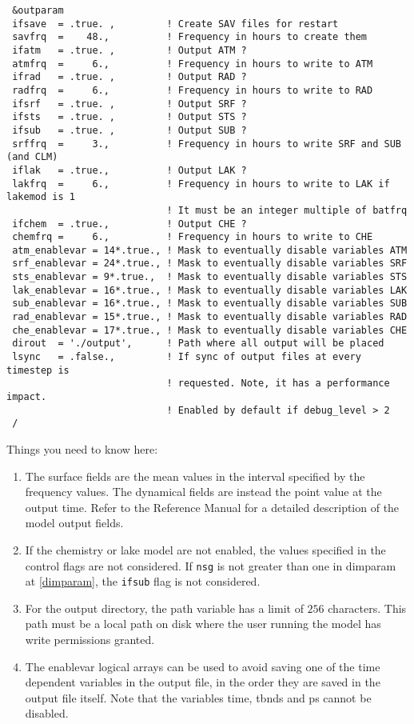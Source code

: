 {\footnotesize
\begin{Verbatim}
 &outparam
 ifsave  = .true. ,         ! Create SAV files for restart
 savfrq  =    48.,          ! Frequency in hours to create them
 ifatm   = .true. ,         ! Output ATM ?
 atmfrq  =     6.,          ! Frequency in hours to write to ATM
 ifrad   = .true. ,         ! Output RAD ?
 radfrq  =     6.,          ! Frequency in hours to write to RAD
 ifsrf   = .true. ,         ! Output SRF ?
 ifsts   = .true. ,         ! Output STS ?
 ifsub   = .true. ,         ! Output SUB ?
 srffrq  =     3.,          ! Frequency in hours to write SRF and SUB (and CLM)
 iflak   = .true.,          ! Output LAK ?
 lakfrq  =     6.,          ! Frequency in hours to write to LAK if lakemod is 1
                            ! It must be an integer multiple of batfrq
 ifchem  = .true.,          ! Output CHE ?
 chemfrq =     6.,          ! Frequency in hours to write to CHE
 atm_enablevar = 14*.true., ! Mask to eventually disable variables ATM
 srf_enablevar = 24*.true., ! Mask to eventually disable variables SRF
 sts_enablevar = 9*.true.,  ! Mask to eventually disable variables STS
 lak_enablevar = 16*.true., ! Mask to eventually disable variables LAK
 sub_enablevar = 16*.true., ! Mask to eventually disable variables SUB
 rad_enablevar = 15*.true., ! Mask to eventually disable variables RAD
 che_enablevar = 17*.true., ! Mask to eventually disable variables CHE
 dirout  = './output',      ! Path where all output will be placed
 lsync   = .false.,         ! If sync of output files at every timestep is
                            ! requested. Note, it has a performance impact.
                            ! Enabled by default if debug_level > 2
 /
\end{Verbatim}
}

Things you need to know here:

\begin{enumerate}
\item The surface fields are the mean values in the interval specified by
the frequency values. The dynamical fields are instead the point value at the
output time. Refer to the Reference Manual \cite{refman_11} for a detailed
description of the model output fields.
\item If the chemistry or lake model are not enabled, the values specified in
the control flags are not considered. If \verb=nsg= is not greater than one
in dimparam at \ref{dimparam}, the \verb=ifsub= flag is not considered.
\item For the output directory, the path variable has a limit of $256$
characters. This path must be a local path on disk where the user running
the model has write permissions granted.
\item The enablevar logical arrays can be used to avoid saving one of the time
dependent variables in the output file, in the order they are saved in the output
file itself. Note that the variables time, tbnds and ps cannot be disabled.
\end{enumerate}


